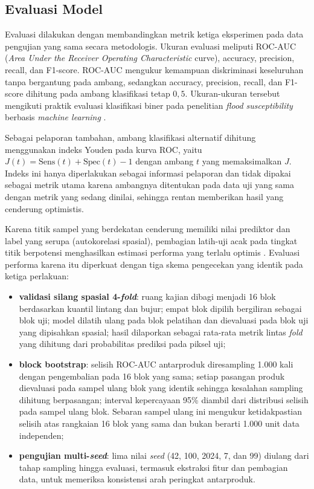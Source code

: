 \documentclass[12pt]{article}
\begin{document}
\subsection{Evaluasi Model}

Evaluasi dilakukan dengan membandingkan metrik ketiga eksperimen pada data
pengujian yang sama secara metodologis. Ukuran evaluasi meliputi ROC-AUC
(\textit{Area Under the Receiver Operating Characteristic} curve),
accuracy, precision, recall, dan F1-score. ROC-AUC mengukur kemampuan
diskriminasi keseluruhan tanpa bergantung pada ambang, sedangkan accuracy,
precision, recall, dan F1-score dihitung pada ambang klasifikasi tetap
$0{,}5$. Ukuran-ukuran tersebut mengikuti praktik evaluasi klasifikasi biner
pada penelitian \textit{flood susceptibility} berbasis \textit{machine
learning} \cite{hakim2026}.

Sebagai pelaporan tambahan, ambang klasifikasi alternatif dihitung menggunakan
indeks Youden \cite{youden1950} pada kurva ROC, yaitu
$J(t)=\text{Sens}(t)+\text{Spec}(t)-1$ dengan ambang $t$ yang memaksimalkan
$J$. Indeks ini hanya diperlakukan sebagai informasi pelaporan dan tidak
dipakai sebagai metrik utama karena ambangnya ditentukan pada data uji yang
sama dengan metrik yang sedang dinilai, sehingga rentan memberikan hasil yang
cenderung optimistis.

Karena titik sampel yang berdekatan cenderung memiliki nilai prediktor dan
label yang serupa (autokorelasi spasial), pembagian latih-uji acak pada
tingkat titik berpotensi menghasilkan estimasi performa yang terlalu optimis
\cite{roberts2017,ploton2020}. Evaluasi performa karena itu diperkuat dengan
tiga skema pengecekan yang identik pada ketiga perlakuan:

\begin{itemize}
\item \textbf{validasi silang spasial 4-\textit{fold}}: ruang kajian dibagi
menjadi 16 blok berdasarkan kuantil lintang dan bujur; empat blok dipilih
bergiliran sebagai blok uji; model dilatih ulang pada blok pelatihan dan
dievaluasi pada blok uji yang dipisahkan spasial; hasil dilaporkan sebagai
rata-rata metrik lintas \textit{fold} yang dihitung dari probabilitas
prediksi pada piksel uji;
\item \textbf{block bootstrap}: selisih ROC-AUC antarproduk diresampling
1.000 kali dengan pengembalian pada 16 blok yang sama; setiap pasangan
produk dievaluasi pada sampel ulang blok yang identik sehingga kesalahan
sampling dihitung berpasangan; interval kepercayaan 95\% diambil dari
distribusi selisih pada sampel ulang blok. Sebaran sampel ulang ini mengukur
ketidakpastian selisih atas rangkaian 16 blok yang sama dan bukan berarti
1.000 unit data independen;
\item \textbf{pengujian multi-\textit{seed}}: lima nilai \textit{seed}
(42, 100, 2024, 7, dan 99) diulang dari tahap sampling hingga evaluasi,
termasuk ekstraksi fitur dan pembagian data, untuk memeriksa konsistensi
arah peringkat antarproduk.
\end{itemize}
\end{document}
